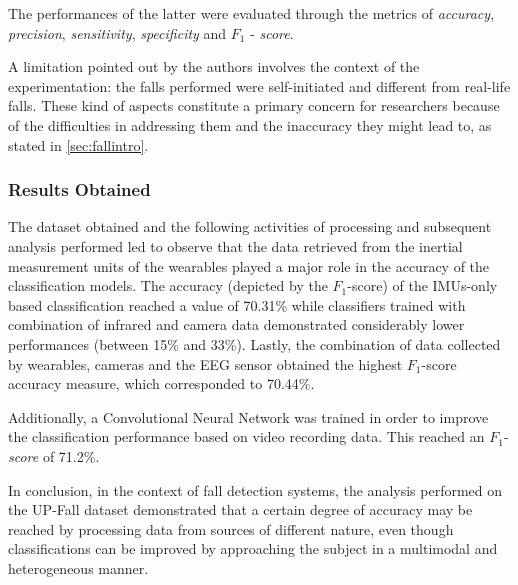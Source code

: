 The performances of the latter were evaluated through the metrics of \textit{accuracy}, \textit{precision}, \textit{sensitivity}, \textit{specificity} and $F_1$ - \textit{score}.

A limitation pointed out by the authors \cite{umafall} involves the context of the experimentation: the falls performed were self-initiated and different from real-life falls. These kind of aspects constitute a primary concern for researchers because of the difficulties in addressing them and the inaccuracy they might lead to, as stated in \ref{sec:fallintro}.

\subsubsection{Results Obtained}\label{subsubsec:upfall-results}

The dataset obtained and the following activities of processing and subsequent analysis performed led to observe that the data retrieved from the inertial measurement units of the wearables played a major role in the accuracy of the classification models. The accuracy (depicted by the $F_1$-score) of the IMUs-only based classification reached a value of 70.31\% while classifiers trained with combination of infrared and camera data demonstrated considerably lower performances (between 15\% and 33\%). Lastly, the combination of data collected by wearables, cameras and the EEG sensor obtained the highest $F_1$-score accuracy measure, which corresponded to 70.44\%. 

Additionally, a Convolutional Neural Network was trained in order to improve the classification performance based on video recording data. This reached an $F_1$-\textit{score} of 71.2\%.

In conclusion, in the context of fall detection systems, the analysis performed on the UP-Fall dataset demonstrated that a certain degree of accuracy may be reached by processing data from sources of different nature, even though classifications can be improved by approaching the subject in a multimodal and heterogeneous manner.

